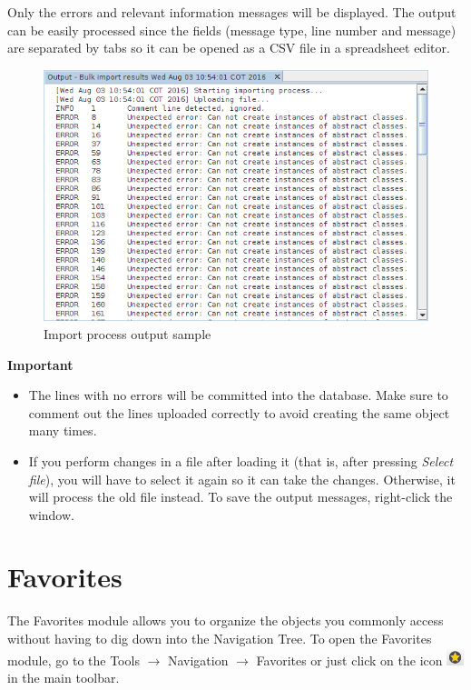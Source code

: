 \documentclass[a4paper]{article}
\begin{document}
				Only the errors and relevant information messages will be displayed. The output can be easily processed since the fields (message type, line number and message)	are separated by tabs so it can be opened as a CSV file in a spreadsheet editor. 
				
				\begin{figure}[h!]
					\centering
					\includegraphics[width=0.7\linewidth]{img/bulk_import_output_window.png}
					\caption{Import process output sample}
					\label{fig:bulk_import_output_window}
				\end{figure}	
				
				\newpage
				\begin{framed} {\large \textbf{Important}}
					\begin{itemize}
					\item The lines with no errors will be committed into the database. Make sure to comment out the lines uploaded correctly to avoid creating the same object many times.
					
					\item If you perform changes in a file after loading it (that is, after pressing \textit{Select file}), you will have to select it again so it can take the changes. Otherwise, it will process the old file instead. To save the output messages, right-click the window.
					\end{itemize}
				\end{framed}
		
		\clearpage
		\section{Favorites}\label{sec:favorites}
		
			The Favorites module allows you to organize the objects you commonly access without having to dig down into the Navigation Tree. To open the Favorites module, go to the Tools $\rightarrow$ Navigation $\rightarrow$ Favorites or just click on the icon
			\includegraphics[width=0.5cm]{img/icon_bookmarks.png} in the main toolbar.
			
\end{document}
